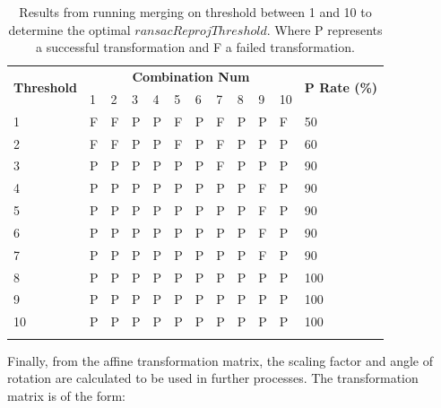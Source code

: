 \begin{table}[h]
\small
\setlength\tabcolsep{0.2pt}
\begin{longtable}{|p{2.1cm}|p{1.2cm} p{1.2cm} p{1.2cm} p{1.2cm} p{1.2cm} p{1.2cm} p{1.2cm} p{1.2cm} p{1.2cm} p{1.2cm}|p{2.2cm}|}%
\caption[Determining $ransacReprojThreshold$]{Results from running merging on threshold between 1 and 10 to determine the optimal $ransacReprojThreshold$. Where P represents a successful transformation and F a failed transformation.} 
\hline
\multirow{2}{*}{\textbf{Threshold}} & \multicolumn{10}{c|}{\textbf{Combination Num}}                                                    & \multirow{2}{*}{\textbf{P Rate (\%)}} \\ \cline{2-11}
            & 1       & 2       & 3       & 4       & 5       & 6       & 7       & 8       & 9       & 10  &    \\ 
\hline
\endfirsthead
\endhead
\hline
\endfoot
\endlastfoot

1                                   & F & F & P & P & F & P & F & P & P & F & 50                        \\
2                                   & F & F & P & P & F & P & F & P & P & P & 60                        \\
3                                   & P & P & P & P & P & P & F & P & P & P & 90                        \\
4                                   & P & P & P & P & P & P & P & P & F & P & 90                         \\
5                                   & P & P & P & P & P & P & P & P & F & P & 90                         \\
6                                   & P & P & P & P & P & P & P & P & F & P & 90                        \\
7                                   & P & P & P & P & P & P & P & P & F & P & 90                         \\
8                                   & P & P & P & P & P & P & P & P & P & P & 100                       \\
9                                   & P & P & P & P & P & P & P & P & P & P & 100                       \\
10                                  & P & P & P & P & P & P & P & P & P & P & 100                       \\ 
\hline
\label{table:ransacReprojThreshold}
\end{longtable}
\end{table}
Finally, from the affine transformation matrix, the scaling factor and angle of rotation are calculated to be used in further processes. The transformation matrix is of the form:

